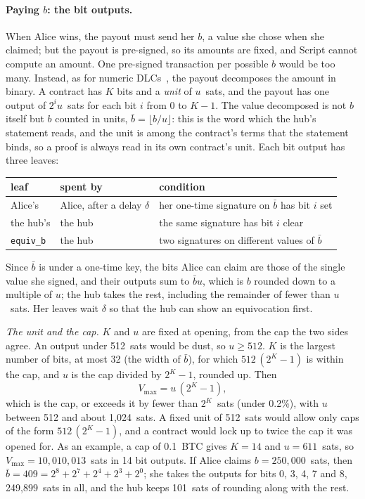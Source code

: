 \documentclass[11pt]{article}
\newcommand{\vmax}{V_{\max}}
\newcommand{\tx}[1]{\texttt{#1}}
\begin{document}
\paragraph{Paying $b$: the bit outputs.} When Alice wins, the payout
must send her $b$, a value she chose when she claimed; but the
payout is pre-signed, so its amounts are fixed, and Script cannot
compute an amount. One pre-signed transaction per possible $b$ would be
too many. Instead, as for numeric DLCs~\cite{dlcnumeric}, the payout
decomposes the amount in binary. A contract has $K$ bits and a
\emph{unit} of $u$~sats, and the payout has one output of $2^i u$~sats
for each bit $i$ from $0$ to $K - 1$. The value decomposed is not $b$
itself but $b$ counted in units, $\bar b = \lfloor b/u \rfloor$: this
is the word which the hub's statement reads,
and the unit is among the contract's terms that the statement binds, so
a proof is always read in its own contract's unit. Each bit output has
three leaves:
\begin{center}
\small
\begin{tabular}{lll}
\toprule
leaf & spent by & condition \\
\midrule
Alice's & Alice, after a delay $\delta$ & her one-time signature on $\bar b$ has bit $i$ set \\
the hub's & the hub & the same signature has bit $i$ clear \\
\tx{equiv\_b} & the hub & two signatures on different values of $\bar b$ \\
\bottomrule
\end{tabular}
\end{center}
Since $\bar b$ is under a one-time key, the bits Alice can claim are
those of the single value she signed, and their outputs sum to
$\bar b u$, which is $b$ rounded down to a multiple of $u$; the hub takes
the rest, including the remainder of fewer than $u$~sats. Her leaves
wait $\delta$ so that the hub can show an equivocation first.

\emph{The unit and the cap.} $K$ and $u$ are fixed at opening, from the
cap the two sides agree. An output under 512~sats would be dust, so
$u \ge 512$. $K$ is the largest number of bits, at most 32 (the width of
$\bar b$), for which $512\,(2^K - 1)$ is within the cap, and $u$ is the
cap divided by $2^K - 1$, rounded up. Then
\[
\vmax = u\,(2^K - 1),
\]
which is the cap, or exceeds it by fewer than $2^K$~sats (under 0.2\%),
with $u$ between 512 and about 1{,}024~sats. A fixed unit of 512~sats
would allow only caps of the form $512\,(2^K - 1)$, and a contract would
lock up to twice the cap it was opened for. As an example, a cap of
0.1~BTC gives $K = 14$ and $u = 611$~sats, so $\vmax =
10{,}010{,}013$~sats in 14 bit outputs. If Alice claims $b =
250{,}000$~sats, then $\bar b = 409 = 2^8 + 2^7 + 2^4 + 2^3 + 2^0$; she
takes the outputs for bits 0, 3, 4, 7 and 8, 249{,}899~sats in all, and
the hub keeps 101~sats of rounding along with the rest.
\end{document}
